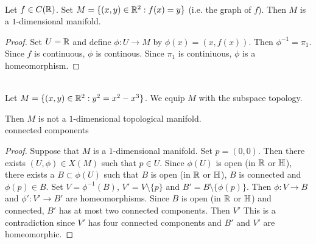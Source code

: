 \documentclass{book}
\begin{document}
	\begin{ex}  \\
		Let $f \in C(\mathbb{R})$. Set $M = \{(x,y) \in \mathbb{R}^2: f(x) = y\}$ (i.e. the graph of $f$). Then $M$ is a $1$-dimensional manifold.  
	\end{ex}
	
	\begin{proof}
		Set $U = \mathbb{R}$ and define $\phi: U \rightarrow M$ by $\phi(x) = (x, f(x))$. Then $\phi^{-1} = \pi_1$. Since $f$ is continuous, $\phi$ is continous. Since $\pi_1$ is continiuous, $\phi$ is a homeomorphism.  
	\end{proof}
	
	\begin{ex} \\
		Let $M = \{(x,y) \in \mathbb{R}^2: y^2 = x^2 - x^3\}$. We equip $M$ with the subspace topology.
		\begin{center}
		\end{center}
		Then $M$ is not a $1$-dimensional topological manifold.\\
		 connected components
	\end{ex}
	
	\begin{proof}
		Suppose that $M$ is a $1$-dimensional manifold. Set $p = (0,0)$. Then there exists $(U, \phi) \in X(M)$ such that $p \in U$. Since $\phi(U)$ is open (in $\mathbb{R}$ or $\mathbb{H}$), there exists a $B \subset \phi(U)$ such that $B$ is open (in $\mathbb{R}$ or $\mathbb{H}$), $B$ is connected and $\phi(p) \in B$. Set $V = \phi^{-1}(B)$, $V' = V \setminus \{p\}$ and $B' = B \setminus \{\phi(p)\}$. Then $\phi: V \rightarrow B$ and $\phi': V' \rightarrow B'$ are homeomorphisms. Since $B$ is open (in $\mathbb{R}$ or $\mathbb{H}$) and connected, $B'$ has at most two connected components. Then $V'$ This is a contradiction since $V'$ has four connected components and $B'$ and $V'$ are homeomorphic. 
	\end{proof}
	
	
	
\end{document}

